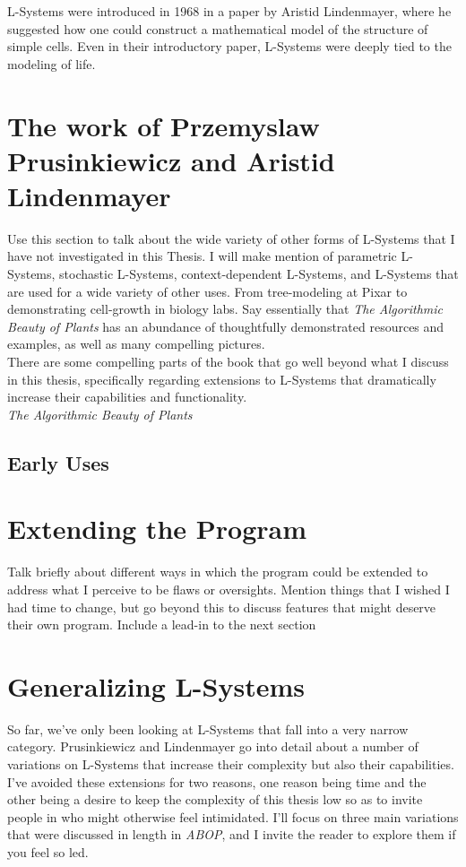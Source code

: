 \documentclass[12pt,twoside]{reedthesis}
\begin{document}
	L-Systems were introduced in 1968 in a paper by Aristid Lindenmayer, where he suggested how one could construct a mathematical model of the structure of simple cells. Even in their introductory paper, L-Systems were deeply tied to the modeling of life.\\


\section{The work of Przemyslaw Prusinkiewicz and Aristid Lindenmayer}

Use this section to talk about the wide variety of other forms of L-Systems that I have not investigated in this Thesis. I will make mention of parametric L-Systems, stochastic L-Systems, context-dependent L-Systems, and L-Systems that are used for a wide variety of other uses. From tree-modeling at Pixar to demonstrating cell-growth in biology labs.
Say essentially that \textit{The Algorithmic Beauty of Plants} has an abundance of thoughtfully demonstrated resources and examples, as well as many compelling pictures.\\

 There are some compelling parts of the book that go well beyond what I discuss in this thesis, specifically regarding extensions to L-Systems that dramatically increase their capabilities and functionality.\\

	\textit{The Algorithmic Beauty of Plants} 

\subsection{Early Uses}


\section{Extending the Program}
Talk briefly about different ways in which the program could be extended to address what I perceive to be flaws or oversights. Mention things that I wished I had time to change, but go beyond this to discuss features that might deserve their own program. Include a lead-in to the next section\\

\section{Generalizing L-Systems}
So far, we've only been looking at L-Systems that fall into a very narrow category. Prusinkiewicz and Lindenmayer go into detail about a number of variations on L-Systems that increase their complexity but also their capabilities. I've avoided these extensions for two reasons, one reason being time and the other being a desire to keep the complexity of this thesis low so as to invite people in who might otherwise feel intimidated. I'll focus on three main variations that were discussed in length in \textit{ABOP}, and I invite the reader to explore them if you feel so led.\\
\end{document}
